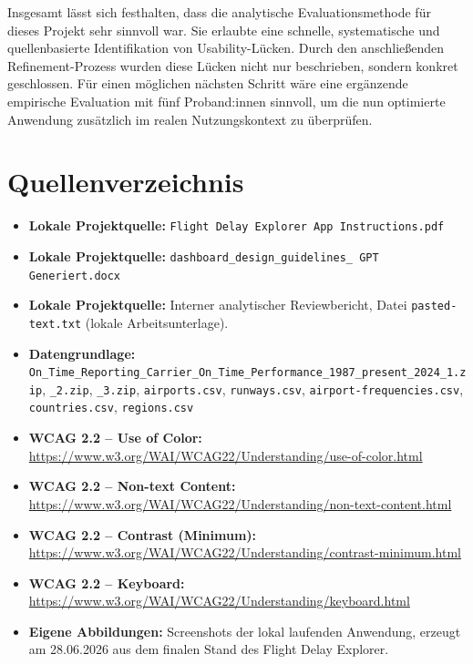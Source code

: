 \documentclass[11pt,a4paper]{article}
\begin{document}
Insgesamt lässt sich festhalten, dass die analytische Evaluationsmethode für dieses Projekt sehr sinnvoll war. Sie erlaubte eine schnelle, systematische und quellenbasierte Identifikation von Usability-Lücken. Durch den anschließenden Refinement-Prozess wurden diese Lücken nicht nur beschrieben, sondern konkret geschlossen. Für einen möglichen nächsten Schritt wäre eine ergänzende empirische Evaluation mit fünf Proband:innen sinnvoll, um die nun optimierte Anwendung zusätzlich im realen Nutzungskontext zu überprüfen.

\newpage
\section*{Quellenverzeichnis}

\begin{itemize}[leftmargin=1.2cm]
\item \textbf{Lokale Projektquelle:} \texttt{Flight Delay Explorer App Instructions.pdf}
\item \textbf{Lokale Projektquelle:} \texttt{dashboard\_design\_guidelines\_ GPT Generiert.docx}
\item \textbf{Lokale Projektquelle:} Interner analytischer Reviewbericht, Datei \texttt{pasted-text.txt} (lokale Arbeitsunterlage).
\item \textbf{Datengrundlage:} \texttt{On\_Time\_Reporting\_Carrier\_On\_Time\_Performance\_1987\_present\_2024\_1.zip}, \texttt{\_2.zip}, \texttt{\_3.zip}, \texttt{airports.csv}, \texttt{runways.csv}, \texttt{airport-frequencies.csv}, \texttt{countries.csv}, \texttt{regions.csv}
\item \textbf{WCAG 2.2 -- Use of Color:} \url{https://www.w3.org/WAI/WCAG22/Understanding/use-of-color.html}
\item \textbf{WCAG 2.2 -- Non-text Content:} \url{https://www.w3.org/WAI/WCAG22/Understanding/non-text-content.html}
\item \textbf{WCAG 2.2 -- Contrast (Minimum):} \url{https://www.w3.org/WAI/WCAG22/Understanding/contrast-minimum.html}
\item \textbf{WCAG 2.2 -- Keyboard:} \url{https://www.w3.org/WAI/WCAG22/Understanding/keyboard.html}
\item \textbf{Eigene Abbildungen:} Screenshots der lokal laufenden Anwendung, erzeugt am 28.06.2026 aus dem finalen Stand des Flight Delay Explorer.
\end{itemize}
\end{document}

